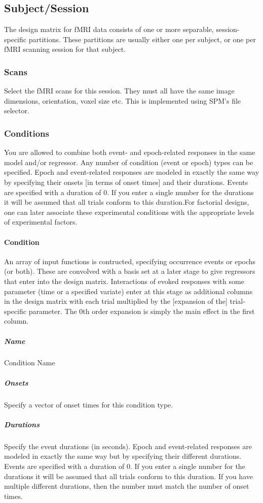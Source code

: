 \documentclass[a4paper,titlepage]{book}
\begin{document}
\subsection{Subject/Session}
The design matrix for fMRI data consists of one or more separable, session-specific partitions.  These partitions are usually either one per subject, or one per fMRI scanning session for that subject.


\subsubsection{Scans}
Select the fMRI scans for this session.  They must all have the same image dimensions, orientation, voxel size etc. This is implemented 
using SPM's file selector.


\subsubsection{Conditions}
You are allowed to combine both event- and epoch-related responses in the same model and/or regressor. Any number of condition (event or epoch) types can be specified.  Epoch and event-related responses are modeled in exactly the same way by specifying their onsets [in terms of onset times] and their durations.  Events are specified with a duration of 0.  If you enter a single number for the durations it will be assumed that all trials conform to this duration.For factorial designs, one can later associate these experimental conditions with the appropriate levels of experimental factors. 


\paragraph{Condition}
An array of input functions is contructed, specifying occurrence events or epochs (or both). These are convolved with a basis set at a later stage to give regressors that enter into the design matrix. Interactions of evoked responses with some parameter (time or a specified variate) enter at this stage as additional columns in the design matrix with each trial multiplied by the [expansion of the] trial-specific parameter. The 0th order expansion is simply the main effect in the first column.


\subparagraph{Name}
Condition Name


\subparagraph{Onsets}
Specify a vector of onset times for this condition type. 


\subparagraph{Durations}
Specify the event durations (in seconds). Epoch and event-related responses are modeled in exactly the same way but by specifying their different durations.  Events are specified with a duration of 0.  If you enter a single number for the durations it will be assumed that all trials conform to this duration. If you have multiple different durations, then the number must match the number of onset times.
\end{document}
